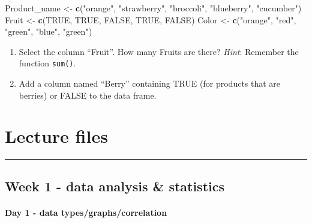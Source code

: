 \documentclass[
]{book}
\newenvironment{Shaded}{\begin{snugshade}}{\end{snugshade}}
\newcommand{\ConstantTok}[1]{\textcolor[rgb]{0.56,0.35,0.01}{#1}}
\newcommand{\FunctionTok}[1]{\textcolor[rgb]{0.13,0.29,0.53}{\textbf{#1}}}
\newcommand{\NormalTok}[1]{#1}
\newcommand{\OtherTok}[1]{\textcolor[rgb]{0.56,0.35,0.01}{#1}}
\newcommand{\StringTok}[1]{\textcolor[rgb]{0.31,0.60,0.02}{#1}}
\begin{document}
\begin{Shaded}
\begin{Highlighting}[]
\NormalTok{Product\_name }\OtherTok{\textless{}{-}} \FunctionTok{c}\NormalTok{(}\StringTok{"orange"}\NormalTok{, }\StringTok{"strawberry"}\NormalTok{, }\StringTok{"broccoli"}\NormalTok{, }\StringTok{"blueberry"}\NormalTok{, }\StringTok{"cucumber"}\NormalTok{)}
\NormalTok{Fruit }\OtherTok{\textless{}{-}} \FunctionTok{c}\NormalTok{(}\ConstantTok{TRUE}\NormalTok{, }\ConstantTok{TRUE}\NormalTok{, }\ConstantTok{FALSE}\NormalTok{, }\ConstantTok{TRUE}\NormalTok{, }\ConstantTok{FALSE}\NormalTok{)}
\NormalTok{Color }\OtherTok{\textless{}{-}} \FunctionTok{c}\NormalTok{(}\StringTok{"orange"}\NormalTok{, }\StringTok{"red"}\NormalTok{, }\StringTok{"green"}\NormalTok{, }\StringTok{"blue"}\NormalTok{, }\StringTok{"green"}\NormalTok{)}
\end{Highlighting}
\end{Shaded}

\begin{enumerate}
\def\labelenumi{\arabic{enumi}.}
\setcounter{enumi}{1}
\item
  Select the column ``Fruit''.
  How many Fruits are there?
  \emph{Hint}: Remember the function \texttt{sum()}.
\item
  Add a column named ``Berry'' containing TRUE (for products that are berries) or FALSE to the data frame.
\end{enumerate}

\hypertarget{lecture-files}{%
\chapter{Lecture files}\label{lecture-files}}

\begin{center}\rule{0.5\linewidth}{0.5pt}\end{center}

\hypertarget{week-1---data-analysis-statistics}{%
\section{Week 1 - data analysis \& statistics}\label{week-1---data-analysis-statistics}}

\hypertarget{day-1---data-typesgraphscorrelation}{%
\subsubsection{Day 1 - data types/graphs/correlation}\label{day-1---data-typesgraphscorrelation}}
\end{document}
